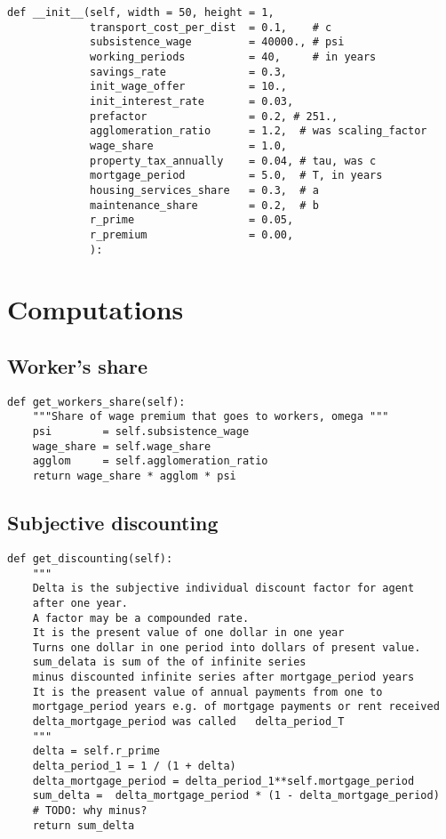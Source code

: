 \begin{lstlisting}
def __init__(self, width = 50, height = 1,
             transport_cost_per_dist  = 0.1,    # c
             subsistence_wage         = 40000., # psi
             working_periods          = 40,     # in years
             savings_rate             = 0.3,
             init_wage_offer          = 10.,
             init_interest_rate       = 0.03,
             prefactor                = 0.2, # 251., 
             agglomeration_ratio      = 1.2,  # was scaling_factor
             wage_share               = 1.0,
             property_tax_annually    = 0.04, # tau, was c
             mortgage_period          = 5.0,  # T, in years
             housing_services_share   = 0.3,  # a
             maintenance_share        = 0.2,  # b
             r_prime                  = 0.05,
             r_premium                = 0.00,
             ):
\end{lstlisting}

\section{Computations}

\subsection{Worker's share}
\begin{lstlisting}
def get_workers_share(self):
    """Share of wage premium that goes to workers, omega """
    psi        = self.subsistence_wage
    wage_share = self.wage_share
    agglom     = self.agglomeration_ratio
    return wage_share * agglom * psi
\end{lstlisting}

\subsection{Subjective discounting}
\begin{lstlisting}
def get_discounting(self):
    """
    Delta is the subjective individual discount factor for agent
    after one year. 
    A factor may be a compounded rate.
    It is the present value of one dollar in one year 
    Turns one dollar in one period into dollars of present value.
    sum_delata is sum of the of infinite series 
    minus discounted infinite series after mortgage_period years
    It is the preasent value of annual payments from one to 
    mortgage_period years e.g. of mortgage payments or rent received
    delta_mortgage_period was called   delta_period_T
    """
    delta = self.r_prime
    delta_period_1 = 1 / (1 + delta) 
    delta_mortgage_period = delta_period_1**self.mortgage_period
    sum_delta =  delta_mortgage_period * (1 - delta_mortgage_period)
    # TODO: why minus?
    return sum_delta
\end{lstlisting}

